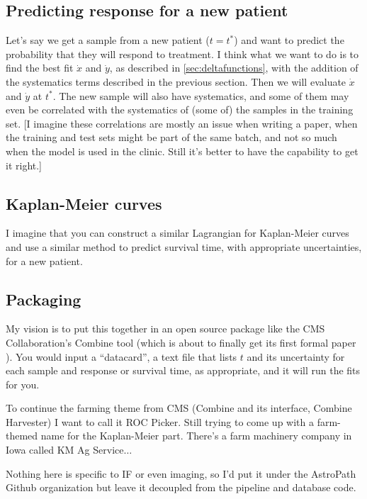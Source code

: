 \documentclass[11pt]{article}
\newcommand{\xdot}{\dot{x}}
\newcommand{\ydot}{\dot{y}}
\begin{document}
\subsection{Predicting response for a new patient}

Let's say we get a sample from a new patient (\(t=t^*\)) and want to predict the probability that they will respond to treatment.  I think what we want to do is to find the best fit \(\xdot\) and \(\ydot\), as described in \cref{sec:deltafunctions}, with the addition of the systematics terms described in the previous section.  Then we will evaluate \(\xdot\) and \(\ydot\) at \(t^*\).  The new sample will also have systematics, and some of them may even be correlated with the systematics of (some of) the samples in the training set.  [I imagine these correlations are mostly an issue when writing a paper, when the training and test sets might be part of the same batch, and not so much when the model is used in the clinic.  Still it's better to have the capability to get it right.]

\subsection{Kaplan-Meier curves}

I imagine that you can construct a similar Lagrangian for Kaplan-Meier curves and use a similar method to predict survival time, with appropriate uncertainties, for a new patient.

\subsection{Packaging}

My vision is to put this together in an open source package like the CMS Collaboration's Combine tool (which is about to finally get its first formal paper \autocite{CAT-23-001}).  You would input a ``datacard'', a text file that lists \(t\) and its uncertainty for each sample and response or survival time, as appropriate, and it will run the fits for you.

To continue the farming theme from CMS (Combine and its interface, Combine Harvester) I want to call it ROC Picker.  Still trying to come up with a farm-themed name for the Kaplan-Meier part.  There's a farm machinery company in Iowa called KM Ag Service$\ldots$

Nothing here is specific to IF or even imaging, so I'd put it under the AstroPath Github organization but leave it decoupled from the pipeline and database code.

\printbibliography
\end{document}
